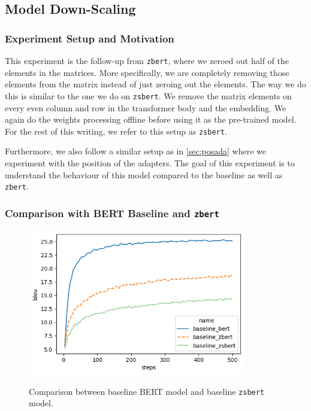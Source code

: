 \subsection{Model Down-Scaling}
\subsubsection{Experiment Setup and Motivation}
This experiment is the follow-up from \texttt{zbert}, where we zeroed out half of the elements in the matrices. More specifically, we are completely removing those elements from the matrix instead of just zeroing out the elements. The way we do this is similar to the one we do on \texttt{zsbert}. We remove the matrix elements on every even column and row in the transformer body and the embedding. We again do the weights processing offline before using it as the pre-trained model. For the rest of this writing, we refer to this setup as \texttt{zsbert}.

Furthermore, we also follow a similar setup as in \cref{sec:posada} where we experiment with the position of the adapters. The goal of this experiment is to understand the behaviour of this model compared to the baseline as well as \texttt{zbert}.

\subsubsection{Comparison with BERT Baseline and \texttt{zbert}}
\label{sec:compbasezbertzsbert}

\begin{figure}[t]
    {\includegraphics[width=0.85\textwidth]{img/baseline_zsbert.png}}
    \centering
    \caption{Comparison between baseline BERT model and baseline \texttt{zsbert} model.}
    \label{img:baseline_zsbert}
\end{figure}

